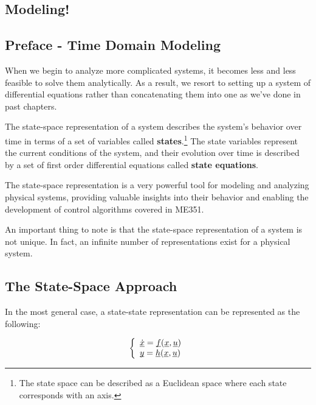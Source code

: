 \documentclass{report}
\begin{document}
\begin{onehalfspacing}
\begin{flushleft}
\chapter{Modeling!}

\section*{Preface - Time Domain Modeling}

When we begin to analyze more complicated systems, it becomes less and less feasible to solve them analytically. As a result, we resort to setting up a system of differential equations rather than concatenating them into one as we've done in past chapters.

\medskip

The state-space representation of a system describes the system's behavior over time in terms of a set of variables called \textbf{states}.\footnote{The state space can be described as a Euclidean space where each state corresponds with an axis.} The state variables represent the current conditions of the system, and their evolution over time is described by a set of first order differential equations called \textbf{state equations}.

\medskip

The state-space representation is a very powerful tool for modeling and analyzing physical systems, providing valuable insights into their behavior and enabling the development of control algorithms covered in ME351.

\medskip

An important thing to note is that the state-space representation of a system is not unique. In fact, an infinite number of representations exist for a physical system.

\section{The State-Space Approach}

In the most general case, a state-state representation can be represented as the following:

\begin{equation*}
    \left\{ \begin{array}{ll}
        \underbar{\(\dot{x}\)} = \underbar{\(f\)}(\underbar{\(x\)}, \underbar{\(u\)}) \\
        \underbar{\(y\)} = \underbar{\(h\)}(\underbar{\(x\)}, \underbar{\(u\)})
    \end{array} \right.
\end{equation*}


\end{flushleft}
\end{onehalfspacing}
\end{document}
